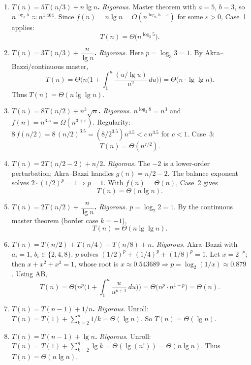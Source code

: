 \documentclass[12pt]{article}
\theoremstyle{definition}
\begin{document}
\medskip
\begin{enumerate}
\item \textbf{$T(n)=5T(n/3)+n\lg n$.}
\emph{Rigorous.} Master theorem with $a=5$, $b=3$, so $n^{\log_3 5}\approx n^{1.464}$.  
Since $f(n)=n\lg n=O(n^{\log_3 5-\varepsilon})$ for some $\varepsilon>0$, Case~1 applies:
\[
\boxed{T(n)=\Theta\!\big(n^{\log_3 5}\big)}.
\]

\item \textbf{$T(n)=3T(n/3)+\dfrac{n}{\lg n}$.}
\emph{Rigorous.} Here $p=\log_3 3=1$. By Akra–Bazzi/continuous master,
\[
T(n)=\Theta\!\Big(n\Big(1+\int_{1}^{n}\frac{(u/\lg u)}{u^{2}}\,du\Big)\Big)
=\Theta\!\big(n\cdot \lg\lg n\big).
\]
Thus \(\boxed{T(n)=\Theta(n\lg\lg n)}\).

\item \textbf{$T(n)=8T(n/2)+n^{3}\sqrt{n}$.}
\emph{Rigorous.} $n^{\log_2 8}=n^3$ and $f(n)=n^{3.5}=\Omega(n^{3+\varepsilon})$.  
Regularity: $8\,f(n/2)=8\,(n/2)^{3.5}=(8/2^{3.5})n^{3.5}<c\,n^{3.5}$ for $c<1$.  
Case~3:
\[
\boxed{T(n)=\Theta(n^{7/2})}.
\]

\item \textbf{$T(n)=2T(n/2-2)+n/2$.}
\emph{Rigorous.} The $-2$ is a lower-order perturbation; Akra–Bazzi handles $g(n)=n/2-2$.  
The balance exponent solves $2\cdot(1/2)^p=1\Rightarrow p=1$.  
With $f(n)=\Theta(n)$, Case~2 gives
\[
\boxed{T(n)=\Theta(n\lg n)}.
\]

\item \textbf{$T(n)=2T(n/2)+\dfrac{n}{\lg n}$.}
\emph{Rigorous.} $p=\log_2 2=1$. By the continuous master theorem (border case $k=-1$),
\[
\boxed{T(n)=\Theta(n\lg\lg n)}.
\]

\item \textbf{$T(n)=T(n/2)+T(n/4)+T(n/8)+n$.}
\emph{Rigorous.} Akra–Bazzi with $a_i=1$, $b_i\in\{2,4,8\}$.  
$p$ solves $(1/2)^p+(1/4)^p+(1/8)^p=1$.  
Let $x=2^{-p}$; then $x+x^2+x^3=1$, whose root is $x\approx 0.543689\Rightarrow p=\log_2(1/x)\approx0.879$.  
Using AB,
\[
T(n)=\Theta\!\Big(n^{p}\Big(1+\int_{1}^{n}\frac{u}{u^{p+1}}\,du\Big)\Big)
=\Theta\!\big(n^{p}\cdot n^{1-p}\big)=\boxed{\Theta(n)}.
\]

\item \textbf{$T(n)=T(n-1)+1/n$.}
\emph{Rigorous.} Unroll:
$T(n)=T(1)+\sum_{k=2}^{n}1/k=\Theta(\lg n)$.  
So \(\boxed{T(n)=\Theta(\lg n)}\).

\item \textbf{$T(n)=T(n-1)+\lg n$.}
\emph{Rigorous.} Unroll:
$T(n)=T(1)+\sum_{k=2}^{n}\lg k=\Theta(\lg(n!))=\Theta(n\lg n)$.  
Thus \(\boxed{T(n)=\Theta(n\lg n)}\).


\end{enumerate}
\end{document}
